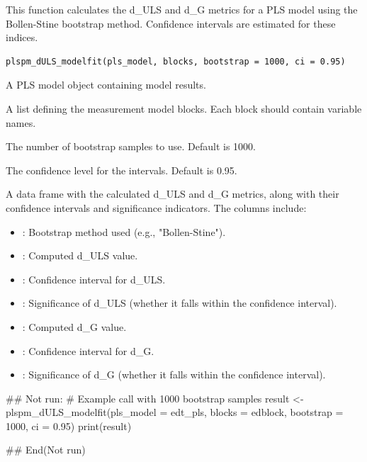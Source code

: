 \documentclass[a4paper]{book}
\begin{document}
%
\begin{Description}
This function calculates the d\_ULS and d\_G metrics for a PLS model using the Bollen-Stine bootstrap method.
Confidence intervals are estimated for these indices.
\end{Description}
%
\begin{Usage}
\begin{verbatim}
plspm_dULS_modelfit(pls_model, blocks, bootstrap = 1000, ci = 0.95)
\end{verbatim}
\end{Usage}
%
\begin{Arguments}
\begin{ldescription}
\item[\code{pls\_model}] A PLS model object containing model results.

\item[\code{blocks}] A list defining the measurement model blocks. Each block should contain variable names.

\item[\code{bootstrap}] The number of bootstrap samples to use. Default is 1000.

\item[\code{ci}] The confidence level for the intervals. Default is 0.95.
\end{ldescription}
\end{Arguments}
%
\begin{Value}
A data frame with the calculated d\_ULS and d\_G metrics, along with their confidence intervals and significance indicators.
The columns include:
\begin{itemize}

\item{} : Bootstrap method used (e.g., "Bollen-Stine").
\item{} : Computed d\_ULS value.
\item{} : Confidence interval for d\_ULS.
\item{} : Significance of d\_ULS (whether it falls within the confidence interval).
\item{} : Computed d\_G value.
\item{} : Confidence interval for d\_G.
\item{} : Significance of d\_G (whether it falls within the confidence interval).

\end{itemize}

\end{Value}
%
\begin{Examples}
\begin{ExampleCode}
\#\# Not run: 
# Example call with 1000 bootstrap samples
result <- plspm_dULS_modelfit(pls_model = edt_pls, blocks = edblock, bootstrap = 1000, ci = 0.95)
print(result)

## End(Not run)

\end{ExampleCode}
\end{Examples}
\end{document}
